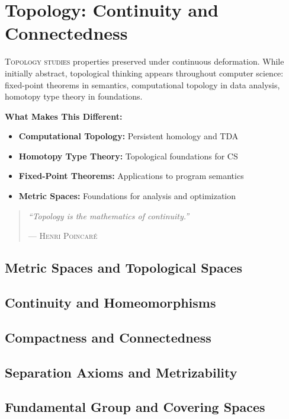 \part{Topology: Continuity and Connectedness}
\label{part:topology}

\begin{partintro}
\lettrine[lines=3]{T}{opology studies} properties preserved under continuous deformation. While initially abstract, topological thinking appears throughout computer science: fixed-point theorems in semantics, computational topology in data analysis, homotopy type theory in foundations.

\vspace{1em}
\textbf{What Makes This Different:}
\begin{itemize}[noitemsep]
    \item \textbf{Computational Topology:} Persistent homology and TDA
    \item \textbf{Homotopy Type Theory:} Topological foundations for CS
    \item \textbf{Fixed-Point Theorems:} Applications to program semantics
    \item \textbf{Metric Spaces:} Foundations for analysis and optimization
\end{itemize}

\begin{quote}
\textit{``Topology is the mathematics of continuity.''}

\hfill--- \textsc{Henri Poincaré}
\end{quote}
\end{partintro}

\chapter{Metric Spaces and Topological Spaces}
\chapter{Continuity and Homeomorphisms}
\chapter{Compactness and Connectedness}
\chapter{Separation Axioms and Metrizability}
\chapter{Fundamental Group and Covering Spaces}
